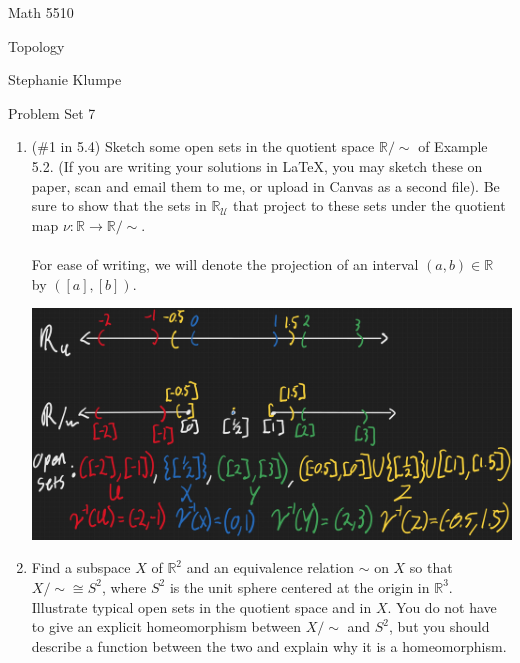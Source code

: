 \documentclass[12pt]{article}
\begin{document}
\noindent Math 5510

\noindent Topology

\noindent Stephanie Klumpe

\vspace{.2in}
\begin{center}
Problem Set 7
\end{center}

 \begin{enumerate}%
\item (\#1 in 5.4) Sketch some open sets in the quotient space $\mathbb{R}/\sim$ of Example 5.2. (If you are writing your solutions in LaTeX, you may sketch these on paper, scan and email them to me, or upload in Canvas as a second file). Be sure to show that the sets in $\mathbb{R}_{\mathcal{U}}$ that project to these sets under the quotient map $\nu: \mathbb{R}\to \mathbb{R}/\sim$.\\\\
For ease of writing, we will denote the projection of an interval $(a,b)\in\mathbb{R}$ by $([a],[b])$.
\begin{center}
\includegraphics[scale=0.4]{ps7p1.JPG}
\end{center}
\item Find a subspace $X$ of $\mathbb{R}^2$ and an equivalence relation $\sim$ on $X$ so that $X/\sim\cong S^2$, where $S^2$ is the unit sphere centered at the origin in $\mathbb{R}^3$. Illustrate typical open sets in the quotient space and in $X$. You do not have to give an explicit homeomorphism between $X/\sim$ and $S^2$, but you should describe a function between the two and explain why it is a homeomorphism.\\\\

\end{enumerate}
\end{document}
